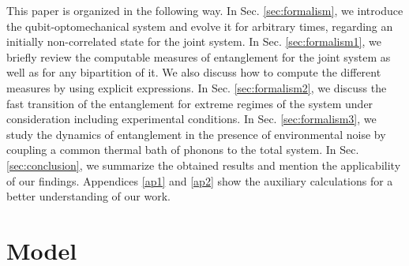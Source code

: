 This paper is organized in the following way. In Sec. \ref{sec:formalism}, we introduce the qubit-optomechanical system and evolve it for arbitrary times, regarding an initially non-correlated state for the joint system. In Sec. \ref{sec:formalism1}, we briefly review the computable measures of entanglement for the joint system as well as for any bipartition of it. We also discuss how to compute the different measures by using explicit expressions. In Sec. \ref{sec:formalism2}, we discuss the fast transition of the entanglement for extreme regimes of the system under consideration including experimental conditions. In Sec. \ref{sec:formalism3}, we study the dynamics of entanglement in the presence of environmental noise by coupling a common thermal bath of phonons to the total system. In Sec. \ref{sec:conclusion}, we summarize the obtained results and mention the applicability of our findings. Appendices \ref{ap1} and \ref{ap2} show the auxiliary calculations for a better understanding of our work.   


\section{\label{sec:formalism}Model}

